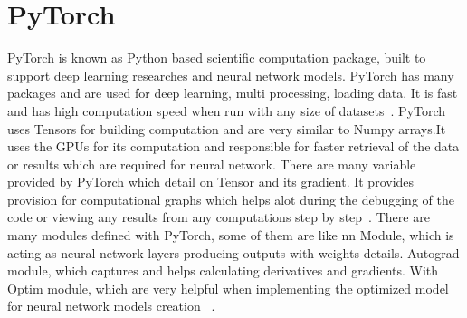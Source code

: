 \section{PyTorch}

PyTorch is known as Python based scientific computation package, built to 
support deep learning researches and neural network models.
PyTorch has many packages and are used for deep learning, multi processing,
loading data. It is fast and has high computation speed when run with any 
size of datasets~\cite{hid-sp18-520-PyTorch}.
PyTorch uses Tensors for building computation and are very similar to 
Numpy arrays.It uses the GPUs for its computation and responsible for faster 
retrieval of the data or results which are required for neural network.
 There are many variable provided by PyTorch which detail on Tensor and 
its gradient. It provides provision for computational graphs which helps 
alot during the debugging of the code or viewing any results from any 
computations step by step~\cite{hid-sp18-520-PyTorchgrad}.
There are many modules defined with PyTorch, some of them are like 
nn Module, which is acting as neural network layers producing outputs 
with weights details. Autograd module, which captures and helps calculating 
derivatives and gradients. With Optim module, which are very helpful when
implementing the optimized model for neural network models creation
~\cite{hid-sp18-520-PyTorchtensor}.